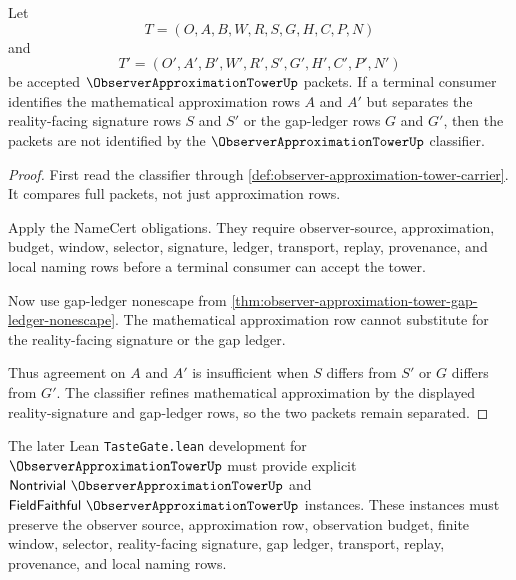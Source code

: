\begin{theorem}
\label{thm:observer-approximation-tower-reality-signature-refinement}
Let
$$
T=(O,A,B,W,R,S,G,H,C,P,N)
$$
and
$$
T'=(O',A',B',W',R',S',G',H',C',P',N')
$$
be accepted $\ObserverApproximationTowerUp$ packets. If a terminal consumer identifies the mathematical approximation rows $A$ and $A'$ but separates the reality-facing signature rows $S$ and $S'$ or the gap-ledger rows $G$ and $G'$, then the packets are not identified by the $\ObserverApproximationTowerUp$ classifier.
\end{theorem}
\begin{proof}
First read the classifier through \autoref{def:observer-approximation-tower-carrier}. It compares full packets, not just approximation rows.

Apply the NameCert obligations. They require observer-source, approximation, budget, window, selector, signature, ledger, transport, replay, provenance, and local naming rows before a terminal consumer can accept the tower.

Now use gap-ledger nonescape from \autoref{thm:observer-approximation-tower-gap-ledger-nonescape}. The mathematical approximation row cannot substitute for the reality-facing signature or the gap ledger.

Thus agreement on $A$ and $A'$ is insufficient when $S$ differs from $S'$ or $G$ differs from $G'$. The classifier refines mathematical approximation by the displayed reality-signature and gap-ledger rows, so the two packets remain separated.
\end{proof}

The later Lean \texttt{TasteGate.lean} development for $\ObserverApproximationTowerUp$ must provide explicit $\mathsf{Nontrivial}\ \ObserverApproximationTowerUp$ and $\mathsf{FieldFaithful}\ \ObserverApproximationTowerUp$ instances. These instances must preserve the observer source, approximation row, observation budget, finite window, selector, reality-facing signature, gap ledger, transport, replay, provenance, and local naming rows.


